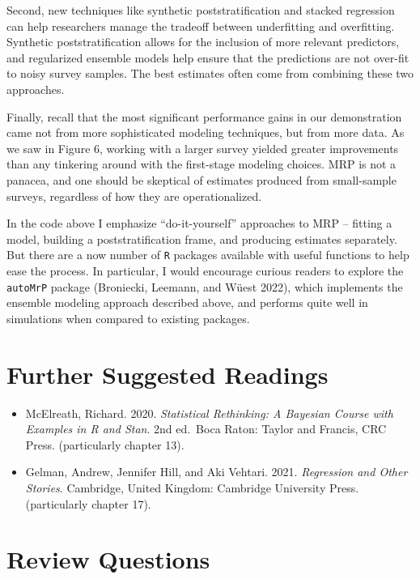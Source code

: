 \documentclass[
]{article}
\begin{document}
Second, new techniques like synthetic poststratification and stacked
regression can help researchers manage the tradeoff between underfitting
and overfitting. Synthetic poststratification allows for the inclusion
of more relevant predictors, and regularized ensemble models help ensure
that the predictions are not over-fit to noisy survey samples. The best
estimates often come from combining these two approaches.

Finally, recall that the most significant performance gains in our
demonstration came not from more sophisticated modeling techniques, but
from more data. As we saw in Figure 6, working with a larger survey
yielded greater improvements than any tinkering around with the
first-stage modeling choices. MRP is not a panacea, and one should be
skeptical of estimates produced from small-sample surveys, regardless of
how they are operationalized.

In the code above I emphasize ``do-it-yourself'' approaches to MRP --
fitting a model, building a poststratification frame, and producing
estimates separately. But there are a now number of \texttt{R} packages
available with useful functions to help ease the process. In particular,
I would encourage curious readers to explore the \texttt{autoMrP}
package (Broniecki, Leemann, and Wüest 2022), which implements the
ensemble modeling approach described above, and performs quite well in
simulations when compared to existing packages.

\hypertarget{further-suggested-readings}{%
\section{Further Suggested Readings}\label{further-suggested-readings}}

\begin{itemize}
\item
  McElreath, Richard. 2020. \emph{Statistical Rethinking: A Bayesian
  Course with Examples in R and Stan}. 2nd ed.~Boca Raton: Taylor and
  Francis, CRC Press. (particularly chapter 13).
\item
  Gelman, Andrew, Jennifer Hill, and Aki Vehtari. 2021. \emph{Regression
  and Other Stories}. Cambridge, United Kingdom: Cambridge University
  Press. (particularly chapter 17).
\end{itemize}

\hypertarget{review-questions}{%
\section{Review Questions}\label{review-questions}}
\end{document}
